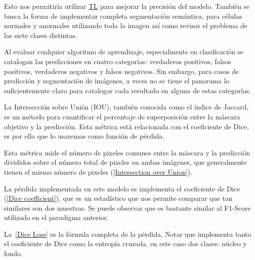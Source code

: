 Esto nos permitiría utilizar \hyperlink{abbr}{TL} para mejorar la precisión del
modelo. También se busca la forma de implementar completa segmentación
semántica, para células normales y anormales utilizando toda la imagen así como
revisar el problema de las siete clases distintas.

Al evaluar cualquier algoritmo de aprendizaje, especialmente en clasificación se
catalogan las predicciones en cuatro categorías: verdaderos positivos, falsos
positivos, verdaderos negativos y falsos negativos. Sin embargo, para casos de
predicción y segmentación de imágenes, a veces no se tiene el panorama lo
suficientemente claro para catalogar cada resultado en alguna de estas
categorías.

La Intersección sobre Unión (IOU), también conocida como el índice de Jaccard, es
un método para cuantificar el porcentaje de superposición entre la máscara
objetivo y la predicción. Esta métrica está relacionada con el coeficiente de Dice,
es por ello que lo usaremos como función de pérdida. 

Esta métrica mide el número de pixeles comunes entre la máscara y la predicción divididos
sobre el número total de pixeles en ambas imágenes, que generalmente tienen el 
mismo número de pixeles (\autoref{Intersection over Union}). 



La pérdida implementada en este modelo es implementa el coeficiente de Dice
(\autoref{Dice coefficient}), que es un estadístico que nos permite comparar que tan
similares son dos muestras. Se puede observar que es bastante similar al F1-Score
utilizado en el paradigma anterior.



La~\autoref{Dice Loss} es la fórmula completa de la pérdida. Notar que
implementa tanto el coeficiente de Dice como la entropía cruzada, en este caso
dos clases: núcleo y fondo.

